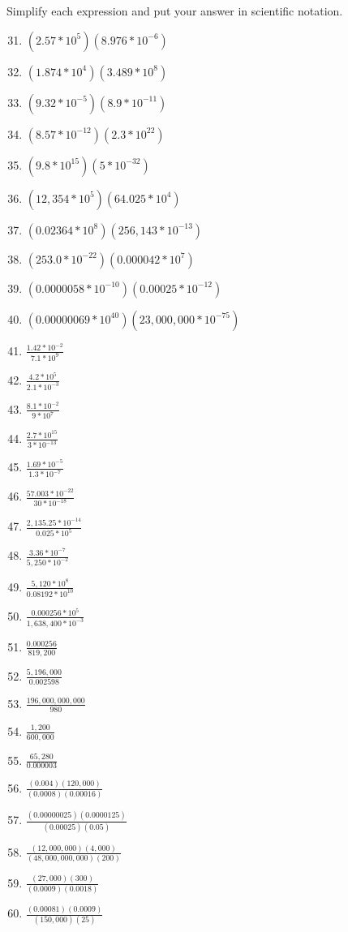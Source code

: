 Simplify each expression and put your answer in scientific notation.
\begin{enumerate}
\setcounter{enumi}{30}
\item $(2.57*10^{5})(8.976*10^{-6})$
\item $(1.874*10^{4})(3.489*10^{8})$
\item $(9.32*10^{-5})(8.9*10^{-11})$
\item $(8.57*10^{-12})(2.3*10^{22})$
\item $(9.8*10^{15})(5*10^{-32})$
\item $(12,354*10^{5})(64.025*10^{4})$
\item $(0.02364*10^{8})(256,143*10^{-13})$
\item $(253.0*10^{-22})(0.000042*10^{7})$
\item $(0.0000058*10^{-10})(0.00025*10^{-12})$
\item $(0.00000069*10^{40})(23,000,000*10^{-75})$
\item {\Large $\frac{1.42*10^{-2}}{7.1*10^{9}}$}
\item {\Large $\frac{4.2*10^{5}}{2.1*10^{-3}}$}
\item {\Large $\frac{8.1*10^{-2}}{9*10^{7}}$}
\item {\Large $\frac{2.7*10^{15}}{3*10^{-13}}$}
\item {\Large $\frac{1.69*10^{-5}}{1.3*10^{-7}}$}
\item {\Large $\frac{57.003*10^{-22}}{30*10^{-18}}$}
\item {\Large $\frac{2,135.25*10^{-14}}{0.025*10^{5}}$}
\item {\Large $\frac{3.36*10^{-7}}{5,250*10^{-2}}$}
\item {\Large $\frac{5,120*10^{8}}{0.08192*10^{10}}$}
\item {\Large $\frac{0.000256*10^{5}}{1,638,400*10^{-3}}$}
\item {\Large $\frac{0.000256}{819,200}$}
\item {\Large $\frac{5,196,000}{0.002598}$}
\item {\Large $\frac{196,000,000,000}{980}$}
\item {\Large $\frac{1,200}{600,000}$}
\item {\Large $\frac{65,280}{0.000003}$}
\item {\Large $\frac{(0.004)(120,000)}{(0.0008)(0.00016)}$}
\item {\Large $\frac{(0.00000025)(0.0000125)}{(0.00025)(0.05)}$}
\item {\Large $\frac{(12,000,000)(4,000)}{(48,000,000,000)(200)}$}
\item {\Large $\frac{(27,000)(300)}{(0.0009)(0.0018)}$}
\item {\Large $\frac{(0.00081)(0.0009)}{(150,000)(25)}$}
\end{enumerate}
